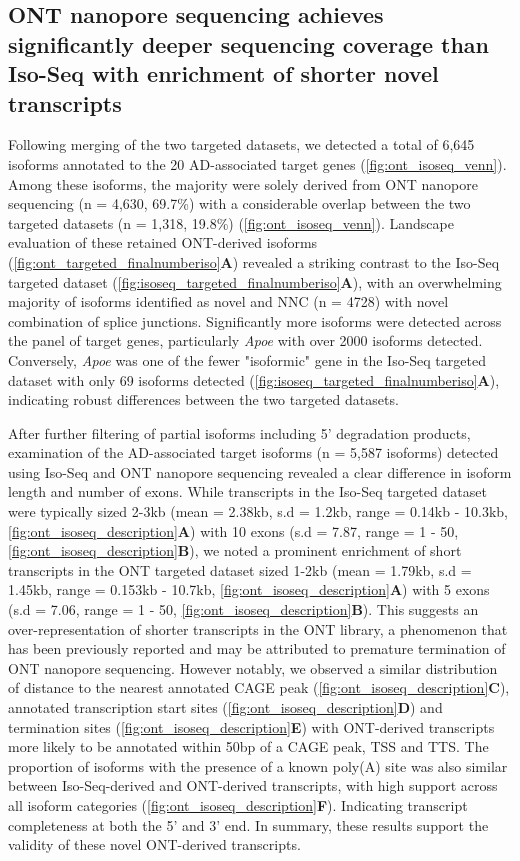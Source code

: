 \newpage
\subsection{ONT nanopore sequencing achieves significantly deeper sequencing coverage than Iso-Seq with enrichment of shorter novel transcripts}

Following merging of the two targeted datasets, we detected a total of 6,645 isoforms annotated to the 20 AD-associated target genes (\cref{fig:ont_isoseq_venn}). Among these isoforms, the majority were solely derived from ONT nanopore sequencing (n = 4,630, 69.7\%) with a considerable overlap between the two targeted datasets (n = 1,318, 19.8\%) (\cref{fig:ont_isoseq_venn}). Landscape evaluation of these retained ONT-derived isoforms (\cref{fig:ont_targeted_finalnumberiso}\textbf{A}) revealed a striking contrast to the Iso-Seq targeted dataset (\cref{fig:isoseq_targeted_finalnumberiso}\textbf{A}), with an overwhelming majority of isoforms identified as novel and NNC (n = 4728) with novel combination of splice junctions. Significantly more isoforms were detected across the panel of target genes, particularly \textit{Apoe} with over 2000 isoforms detected. Conversely, \textit{Apoe} was one of the fewer "isoformic" gene in the Iso-Seq targeted dataset with only 69 isoforms detected (\cref{fig:isoseq_targeted_finalnumberiso}\textbf{A}), indicating robust differences between the two targeted datasets.

After further filtering of partial isoforms including 5' degradation products, examination of the AD-associated target isoforms (n = 5,587 isoforms) detected using Iso-Seq and ONT nanopore sequencing revealed a clear difference in isoform length and number of exons. While transcripts in the Iso-Seq targeted dataset were typically sized 2-3kb (mean = 2.38kb, s.d = 1.2kb, range = 0.14kb - 10.3kb, \cref{fig:ont_isoseq_description}\textbf{A}) with 10 exons (s.d = 7.87, range = 1 - 50, \cref{fig:ont_isoseq_description}\textbf{B}), we noted a prominent enrichment of short transcripts in the ONT targeted dataset sized 1-2kb (mean = 1.79kb, s.d = 1.45kb, range = 0.153kb - 10.7kb, \cref{fig:ont_isoseq_description}\textbf{A}) with 5 exons (s.d = 7.06, range = 1 - 50, \cref{fig:ont_isoseq_description}\textbf{B}). This suggests an over-representation of shorter transcripts in the ONT library, a phenomenon that has been previously reported and may be attributed to premature termination of ONT nanopore sequencing\cite{Byrne2017}. However notably, we observed a similar distribution of distance to the nearest annotated CAGE peak (\cref{fig:ont_isoseq_description}\textbf{C}), annotated transcription start sites (\cref{fig:ont_isoseq_description}\textbf{D}) and termination sites (\cref{fig:ont_isoseq_description}\textbf{E}) with ONT-derived transcripts more likely to be annotated within 50bp of a CAGE peak, TSS and TTS. The proportion of isoforms with the presence of a known poly(A) site was also similar between Iso-Seq-derived and ONT-derived transcripts, with high support across all isoform categories (\cref{fig:ont_isoseq_description}\textbf{F}). Indicating transcript completeness at both the 5' and 3' end. In summary, these results support the validity of these novel ONT-derived transcripts. 

